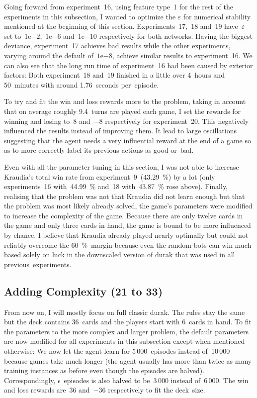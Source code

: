 \documentclass[a4paper,titlepage]{article}
\newcommand{\expn}[2]{{#1}\mathrm{e}{#2}}
\begin{document}
Going forward from experiment~16, using feature type~1 for the rest of the experiments in this subsection, I wanted to optimize the $\varepsilon$ for numerical stability mentioned at the beginning of this section. Experiments~17,~18 and~19 have~$\varepsilon$ set to~$\expn{1}{-2}$,~$\expn{1}{-6}$ and~$\expn{1}{-10}$ respectively for both networks. Having the biggest deviance, experiment~17 achieves bad results while the other experiments, varying around the default of~$\expn{1}{-8}$, achieve similar results to experiment~16. We can also see that the long run time of experiment~16 had been caused by exterior factors: Both experiment~18 and~19 finished in a little over 4~hours and 50~minutes with around 1.76~seconds per~episode.

To try and fit the win and loss rewards more to the problem, taking in account that on average roughly 9.4~turns are played each game, I set the rewards for winning and losing to~8 and~$-8$ respectively for experiment~20. This negatively influenced the results instead of improving them. It lead to large oscillations suggesting that the agent needs a very influential reward at the end of a game so as to more correctly label its previous actions as good or~bad. \medskip

Even with all the parameter tuning in this section, I was not able to increase Kraudia's total win rate from experiment~9~(43.29~\%) by a lot (only experiments~16 with~44.99~\% and~18 with~43.87~\% rose above). Finally, realising that the problem was not that Kraudia did not learn enough but that the problem was most likely already solved, the game's parameters were modified to increase the complexity of the game. Because there are only twelve cards in the game and only three cards in hand, the game is bound to be more influenced by chance. I believe that Kraudia already played nearly optimally but could not reliably overcome the 60~\%~margin because even the random bots can win much based solely on luck in the downscaled version of durak that was used in all previous~experiments.

\subsection{Adding Complexity (21 to 33)}

From now on, I will mostly focus on full classic durak. The rules stay the same but the deck contains 36~cards and the players start with 6~cards in hand. To fit the parameters to the more complex and larger problem, the default parameters are now modified for all experiments in this subsection except when mentioned otherwise: We now let the agent learn for 5\,000~episodes instead of~10\,000 because games take much longer (the agent usually has more than twice as many training instances as before even though the episodes are halved). Correspondingly, $\epsilon$~episodes is also halved to be~3\,000 instead of~6\,000. The win and loss rewards are~36 and~$-36$ respectively to fit the deck~size.
\end{document}
